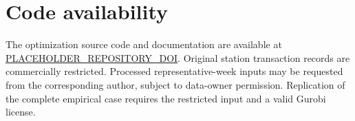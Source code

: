 \section*{Code availability}
The optimization source code and documentation are available at
\url{PLACEHOLDER_REPOSITORY_DOI}. Original station transaction records
are commercially restricted. Processed representative-week inputs may be
requested from the corresponding author, subject to data-owner permission.
Replication of the complete empirical case requires the restricted input
and a valid Gurobi license.
